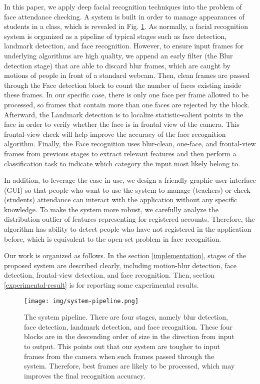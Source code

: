 \documentclass[journal, twocolumn]{IEEEtran}
\begin{document}
In this paper, we apply deep facial recognition techniques into the problem of face attendance checking. A system is built in order to manage appearances of students in a class, which is revealed in Fig. \ref{fig:system}. As normally, a facial recognition system is organized as a pipeline of typical stages such as face detection, landmark detection, and face recognition. However, to ensure input frames for underlying algorithms are high quality, we append an early filter (the Blur detection stage) that are able to discard blur frames, which are caught by motions of people in front of a standard webcam. Then, clean frames are passed through the Face detection block to count the number of faces existing inside these frames. In our specific case, there is only one face per frame allowed to be processed, so frames that contain more than one faces are rejected by the block. Afterward, the Landmark detection is to localize statistic-salient points in the face in order to verify whether the face is in frontal view of the camera. This frontal-view check will help improve the accuracy of the face recognition algorithm. Finally, the Face recognition uses blur-clean, one-face, and frontal-view frames from previous stages to extract relevant features and then perform a classification task to indicate which category the input most likely belong to.

In addition, to leverage the ease in use, we design a friendly graphic user interface (GUI) so that people who want to use the system to manage (teachers) or check (students) attendance can interact with the application without any specific knowledge. To make the system more robust, we carefully analyze the distribution outlier of features representing for registered accounts. Therefore, the algorithm has ability to detect people who have not registered in the application before, which is equivalent to the open-set problem in face recognition.

Our work is organized as follows. In the section \ref{implementation}, stages of the proposed system are described clearly, including motion-blur detection, face detection, frontal-view detection, and face recognition. Then, section \ref{experimental-result} is for reporting some experimental results.


\begin{figure}
    \centering
    \texttt{[image: img/system-pipeline.png]}
	\caption{The system pipeline. There are four stages, namely blur detection, face detection, landmark detection, and face recognition. These four blocks are in the descending order of size in the direction from input to output. This points out that our system are tougher to input frames from the camera when such frames passed through the system. Therefore, best frames are likely to be processed, which may improves the final recognition accuracy.}\label{fig:system}
\end{figure}
\end{document}
